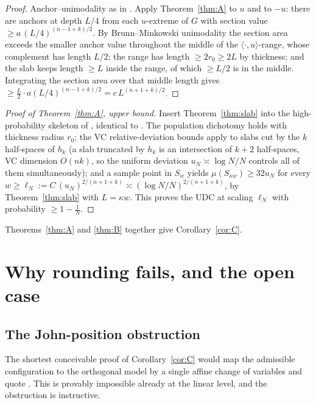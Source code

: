 \documentclass[11pt]{article}
\theoremstyle{definition}
\theoremstyle{remark}
\begin{document}
\begin{proof}
Anchor--unimodality as in \cite{companion3,companion11}.  Apply
Theorem~\ref{thm:A} to $u$ and to $-u$: there are anchors at depth $L/4$ from
each $u$-extreme of $G$ with section value $\ge a\,(L/4)^{(n-1+k)/2}$.  By
Brunn--Minkowski unimodality the section area exceeds the smaller anchor value
throughout the middle of the $\langle\cdot,u\rangle$-range, whose complement has
length $L/2$; the range has length $\ge2r_0\ge2L$ by thickness; and the slab
keeps length $\ge L$ inside the range, of which $\ge L/2$ is in the middle.
Integrating the section area over that middle length gives
$\ge\frac L2\cdot a(L/4)^{(n-1+k)/2}=c\,L^{(n+1+k)/2}$.
\end{proof}

\begin{proof}[Proof of Theorem~\ref{thm:A}, upper bound]
Insert Theorem~\ref{thm:slab} into the high-probability skeleton of
\cite{companion2,companion3}, identical to \cite[\S5]{companion11}.  The
population dichotomy holds with thickness radius $r_0$; the VC relative-deviation
bounds apply to slabs cut by the $k$ half-spaces of $h_k$ (a slab truncated by
$h_k$ is an intersection of $k+2$ half-spaces, VC dimension $O(nk)$, so the
uniform deviation $u_N\asymp\log N/N$ controls all of them simultaneously); and
a sample point in $S_w$ yields $\mu(S_{\kappa w})\ge32u_N$ for every
$w\ge\ell_N:=C\,(u_N)^{2/(n+1+k)}\asymp(\log N/N)^{2/(n+1+k)}$, by
Theorem~\ref{thm:slab} with $L=\kappa w$.  This proves the UDC at scaling
$\ell_N$ with probability $\ge1-\frac1N$.
\end{proof}

\noindent Theorems~\ref{thm:A} and \ref{thm:B} together give
Corollary~\ref{cor:C}.

\section{Why rounding fails, and the open case}\label{sec:john}

\subsection{The John-position obstruction}

The shortest conceivable proof of Corollary~\ref{cor:C} would map the admissible
configuration to the orthogonal model by a single affine change of variables
and quote \cite{companion11}.  This is provably impossible already at the
linear level, and the obstruction is instructive.
\end{document}
